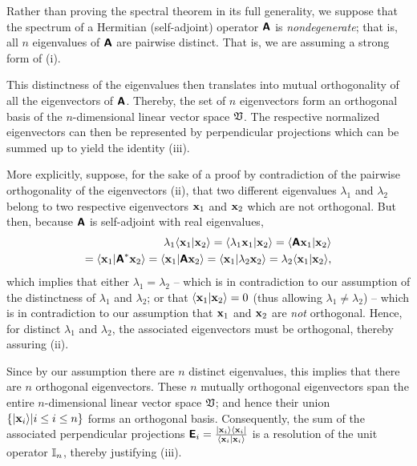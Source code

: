 {\color{OliveGreen}
\bproof
Rather than proving the spectral theorem in its full generality,
we suppose that the spectrum of a Hermitian (self-adjoint) operator $ \textsf{\textbf{A}}$ is {\em nondegenerate};
that is, all $n$ eigenvalues of $\textsf{\textbf{A}}$ are pairwise distinct.
That is, we are assuming a strong form of (i).

This distinctness of the eigenvalues then translates into mutual orthogonality of all the eigenvectors of $ \textsf{\textbf{A}}$.
Thereby, the set of $n$ eigenvectors form an orthogonal basis of the $n$-dimensional linear vector space $\frak V$.
The respective normalized eigenvectors can then be represented by perpendicular projections which can be summed up to yield the identity
(iii).

More explicitly, suppose, for the sake of a proof by contradiction of the pairwise orthogonality of the eigenvectors (ii),
that two different eigenvalues
$\lambda_1$
and
$\lambda_2$
belong to two respective eigenvectors
${\bf x}_1$
and
${\bf x}_2$
which are not orthogonal.
But then, because $\textsf{\textbf{A}}$ is self-adjoint with real eigenvalues,
\begin{equation}
\begin{split}
\lambda_1  \langle {\bf x}_1 \vert {\bf x}_2 \rangle =
\langle \lambda_1  {\bf x}_1 \vert {\bf x}_2 \rangle =
  \langle \textsf{\textbf{A}}{\bf x}_1 \vert {\bf x}_2 \rangle \\=
  \langle {\bf x}_1 \vert \textsf{\textbf{A}}^* {\bf x}_2 \rangle =
  \langle {\bf x}_1 \vert \textsf{\textbf{A}}{\bf x}_2 \rangle =
  \langle {\bf x}_1 \vert \lambda_2 {\bf x}_2 \rangle=
  \lambda_2 \langle {\bf x}_1 \vert {\bf x}_2 \rangle,
\end{split}
\end{equation}
which implies that either   $\lambda_1  = \lambda_2$ -- which is in contradiction to our assumption of the distinctness of  $\lambda_1$ and $\lambda_2$;
or that  $\langle {\bf x}_1 \vert {\bf x}_2 \rangle =0$  (thus allowing $\lambda_1  \neq \lambda_2$) --
which is in contradiction to our assumption that ${\bf x}_1$ and $ {\bf x}_2$ are {\em not} orthogonal.
Hence, for distinct   $\lambda_1$ and $\lambda_2$, the associated eigenvectors must be orthogonal,
thereby assuring (ii).

Since by our assumption there are $n$ distinct eigenvalues, this implies that there are $n$ orthogonal eigenvectors.
These $n$ mutually orthogonal eigenvectors
span the entire $n$-dimensional linear vector space $\frak V$;
and hence their union $\{ \vert {\bf x}_i \rangle \vert i\le i \le n\}$ forms an orthogonal basis.
Consequently, the sum of the associated perpendicular projections $\textsf{\textbf{E}}_i = \frac{\vert {\bf x}_i \rangle \langle {\bf x}_i \vert}{\langle {\bf x}_i \vert {\bf x}_i  \rangle}$
is a resolution of the unit operator ${\Bbb I}_n$, thereby justifying (iii).

}
